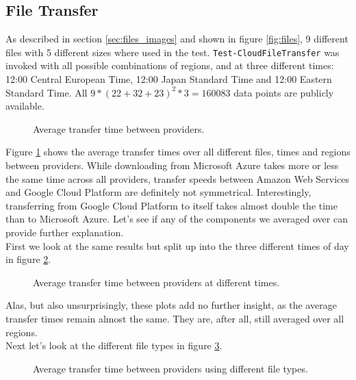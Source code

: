 \documentclass[a4paper,bibliography=totoc]{scrartcl}
\newcommand{\Azure}{Microsoft Azure\xspace}
\newcommand{\GCP}{Google Cloud Platform\xspace}
\newcommand{\AWS}{Amazon Web Services\xspace}
\begin{document}
\subsection{File Transfer}\label{sec:fileresults}
As described in section \ref{sec:files_images} and shown in figure \ref{fig:files}, 9 different files with 5 different sizes where used in the test. \texttt{Test-CloudFileTransfer}\cite{wb_invoke} was invoked with all possible combinations of regions, and at three different times: 12:00 Central European Time, 12:00 Japan Standard Time and 12:00 Eastern Standard Time. All $9*(22+32+23)^2*3=160083$ data points are publicly available.\cite{wb_results_file}\\
\begin{figure}[!ht]
    \centering
    
    \caption{Average transfer time between providers.}
    \label{fig:main}
\end{figure}%
Figure \ref{fig:main} shows the average transfer times over all different files, times and regions between providers. While downloading from \Azure takes more or less the same time across all providers, transfer speeds between \AWS and \GCP are definitely not symmetrical. Interestingly, transferring from \GCP to itself takes almost double the time than to \Azure. Let's see if any of the components we averaged over can provide further explanation.\\
First we look at the same results but split up into the three different times of day in figure \ref{fig:noon}.
\begin{figure}[!ht]
    \centering
    \enspace
    \enspace
    \caption{Average transfer time between providers at different times.}
    \label{fig:noon}
\end{figure}%
Alas, but also unsurprisingly, these plots add no further insight, as the average transfer times remain almost the same. They are, after all, still averaged over all regions.\\
Next let's look at the different file types in figure \ref{fig:type}.
\begin{figure}[!ht]
    \centering
    \enspace
    \enspace
    \caption{Average transfer time between providers using different file types.}
    \label{fig:type}
\end{figure}%
\end{document}
